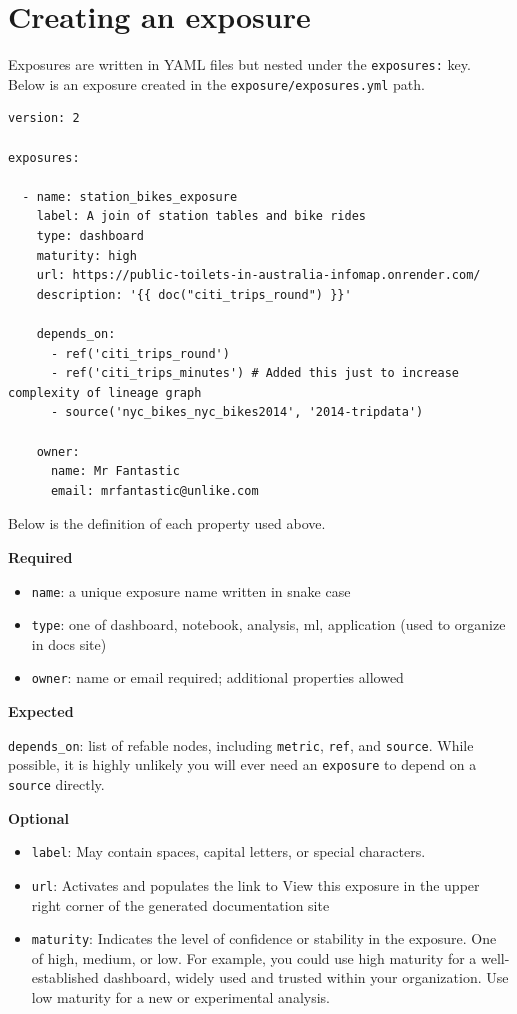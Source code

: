 \documentclass[
]{book}
\begin{document}
\hypertarget{creating-an-exposure}{%
\section{Creating an exposure}\label{creating-an-exposure}}

Exposures are written in YAML files but nested under the \texttt{exposures:} key. Below is an exposure created in the \texttt{exposure/exposures.yml} path.

\begin{verbatim}
version: 2

exposures:

  - name: station_bikes_exposure
    label: A join of station tables and bike rides
    type: dashboard
    maturity: high
    url: https://public-toilets-in-australia-infomap.onrender.com/
    description: '{{ doc("citi_trips_round") }}'

    depends_on:
      - ref('citi_trips_round')
      - ref('citi_trips_minutes') # Added this just to increase complexity of lineage graph
      - source('nyc_bikes_nyc_bikes2014', '2014-tripdata')

    owner:
      name: Mr Fantastic
      email: mrfantastic@unlike.com
\end{verbatim}

Below is the definition of each property used above.

\textbf{Required}

\begin{itemize}
\item
  \texttt{name}: a unique exposure name written in snake case
\item
  \texttt{type}: one of dashboard, notebook, analysis, ml, application (used to organize in docs site)
\item
  \texttt{owner}: name or email required; additional properties allowed
\end{itemize}

\textbf{Expected}

\texttt{depends\_on}: list of refable nodes, including \texttt{metric}, \texttt{ref}, and \texttt{source}. While possible, it is highly unlikely you will ever need an \texttt{exposure} to depend on a \texttt{source} directly.

\textbf{Optional}

\begin{itemize}
\item
  \texttt{label}: May contain spaces, capital letters, or special characters.
\item
  \texttt{url}: Activates and populates the link to View this exposure in the upper right corner of the generated documentation site
\item
  \texttt{maturity}: Indicates the level of confidence or stability in the exposure. One of high, medium, or low. For example, you could use high maturity for a well-established dashboard, widely used and trusted within your organization. Use low maturity for a new or experimental analysis.
\end{itemize}
\end{document}
